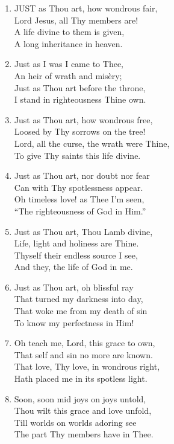 \documentclass[11pt,a4paper]{article}
\begin{document}
\begin{enumerate}
    \item JUST as Thou art, how wondrous fair, \\
        Lord Jesus, all Thy members are! \\
        A life divine to them is given, \\
        A long inheritance in heaven.

    \item Just as I was I came to Thee, \\
        An heir of wrath and mis\`ery; \\
        Just as Thou art before the throne, \\
        I stand in righteousness Thine own.

    \item Just as Thou art, how wondrous free, \\
        Loosed by Thy sorrows on the tree! \\
        Lord, all the curse, the wrath were Thine, \\
        To give Thy saints this life divine.

    \item Just as Thou art, nor doubt nor fear \\
        Can with Thy spotlessness appear. \\
        Oh timeless love! as Thee I'm seen, \\
        ``The righteousness of God in Him.''

    \item Just as Thou art, Thou Lamb divine, \\
        Life, light and holiness are Thine. \\
        Thyself their endless source I see, \\
        And they, the life of God in me.

    \item Just as Thou art, oh blissful ray \\
        That turned my darkness into day, \\
        That woke me from my death of sin \\
        To know my perfectness in Him!

    \item Oh teach me, Lord, this grace to own, \\
        That self and sin no more are known. \\
        That love, Thy love, in wondrous right, \\
        Hath placed me in its spotless light.

    \item Soon, soon mid joys on joys untold, \\
        Thou wilt this grace and love unfold, \\
        Till worlds on worlds adoring see \\
        The part Thy members have in Thee.

\end{enumerate}
\end{document}
